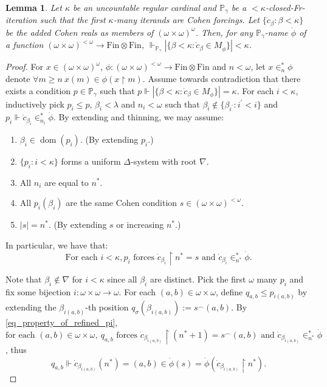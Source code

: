 \documentclass[a4paper,12pt]{amsart}
\newtheorem{lem}[thm]{Lemma}
\theoremstyle{definition}
\numberwithin{thm}{section}
\numberwithin{equation}{section}
\renewcommand{\b}{\beta}
\newcommand{\p}{\mathbb{P}}
\newcommand{\on}{\mathpunct{\upharpoonright}}
\DeclareMathOperator{\dom}{dom}
\newcommand{\forces}{\Vdash}
\newcommand{\finfin}{\mathrm{Fin}\otimes\mathrm{Fin}}
\begin{document}
    \begin{lem}\label{lem:closed_Fr_limits_keep_nonMfinfin_small}
        Let $\kappa$ be an uncountable regular cardinal and $\p_\gamma$ be a ${<}\kappa$-closed-Fr-iteration such that the first $\kappa$-many iterands are Cohen forcings. Let $\{\dot{c}_\b:\b<\kappa\}$ be the added Cohen reals as members of $(\omega\times\omega)^\omega$. Then, for any $\p_\gamma$-name $\dot{\phi}$ of a function $(\omega\times\omega)^{<\omega}\to\finfin$, $\Vdash_{\p_\gamma}|\{\b<\kappa:\dot{c}_\b\in M_{\dot{\phi}} \}|<\kappa$.
    \end{lem}
    \begin{proof}
        For $x\in(\omega\times\omega)^\omega$, $\phi\colon(\omega\times\omega)^{<\omega}\to\finfin$ and $n<\omega$, let $x\in^*_n\phi$ denote $\forall m\geq n~x(m)\in\phi(x\on m)$. 
    	Assume towards contradiction that there exists a condition $p\in\p_\gamma$  such that 
    	$p\Vdash |\{\b<\kappa:\dot{c}_\b\in M_{\dot{\phi}}\}|=\kappa$.
    	For each $i<\kappa$, inductively pick $p_i\leq p$, $\b_i<\lambda$ and $n_i<\omega$ such that $\b_i\notin\{\b_{i^\prime}:i^\prime<i\}$ and $ p_i\Vdash\dot{c}_{\b_i}\in^*_{n_i}\dot{\phi}$.
    	By extending and thinning, we may assume:
    	
    	\begin{enumerate}
    		\item $\b_i\in\dom(p_i)$. (By extending $p_i$.)
    		\item $\{p_i:i<\kappa\}$ forms a uniform $\Delta$-system with root $\nabla$.
    		\item All $n_i$ are equal to $ n^*$.
    		\item All $p_i(\b_i)$ are the same Cohen condition $s\in(\omega\times\omega)^{<\omega}$. 
    		\item $|s|=n^*$. (By extending $s$ or increasing $n^*$.)
    	\end{enumerate}
    	
    	In particular, we have that:
    	\begin{equation}
    		\label{eq_property_of_refined_pi}
    		\text{For each }i<\kappa, p_i\text{ forces }\dot{c}_{\b_i}\on n^*=s\text{ and }\dot{c}_{\b_i}\in^*_{n^*}\dot{\phi}.
    	\end{equation}
    	
    	Note that $\b_i\notin\nabla$ for $i<\kappa$ since all $\b_i$ are distinct. Pick the first $\omega$ many $p_i$ and fix some bijection $i\colon\omega\times\omega\to\omega$.
    	For each $(a,b)\in\omega\times\omega$, define $q_{a,b}\leq p_{i(a,b)}$ by extending the $\b_{i(a,b)}$-th position $q_\sigma(\b_{i(a,b)}):=s^\frown(a,b)$.
    	By \eqref{eq_property_of_refined_pi}, 
    		$\text{for each }(a,b)\in\omega\times\omega,~q_{a,b}\text{ forces }\dot{c}_{\b_{i(a,b)}}\on(n^*+1)=s^\frown(a,b)\text{ and }\dot{c}_{\b_{i(a,b)}}\in^*_{n^*}\dot{\phi}$,
    	thus
    	\begin{equation}
    		\label{eq:q_a_b}
    		q_{a,b}\forces\dot{c}_{\b_{i(a,b)}}(n^*)=(a,b)\in\dot{\phi}(s)=\dot{\phi}(\dot{c}_{\b_{i(a,b)}}\on n^*).
    	\end{equation}
    	

\end{proof}
\end{document}
